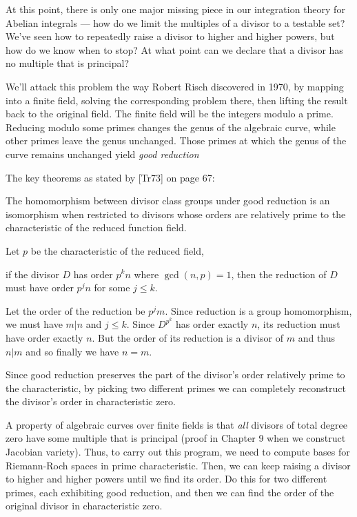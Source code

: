 At this point, there is only one major missing piece in our
integration theory for Abelian integrals --- how do we limit the
multiples of a divisor to a testable set?  We've seen how to
repeatedly raise a divisor to higher and higher powers, but how do we
know when to stop?  At what point can we declare that a divisor has no
multiple that is principal?

We'll attack this problem the way Robert Risch discovered in 1970, by
mapping into a finite field, solving the corresponding problem there,
then lifting the result back to the original field.  The finite field
will be the integers modulo a prime.  Reducing modulo some primes
changes the genus of the algebraic curve, while other primes leave the
genus unchanged.  Those primes at which the genus of the curve remains
unchanged yield {\it good reduction}

The key theorems as stated by [Tr73] on page 67:

\theorem
The homomorphism between divisor class groups under good reduction
is an isomorphism when restricted to divisors whose orders are
relatively prime to the characteristic of the reduced function field.
\endtheorem

Let $p$ be the characteristic of the reduced field,

\theorem
if the divisor $D$ has order $p^k n$ where $\gcd(n,p)=1$, then
the reduction of $D$ must have order $p^j n$ for some $j\le k$.

\proof
Let the order of the reduction be $p^j m$.  Since reduction
is a group homomorphism, we must have $m|n$ and $j \le k$.
Since $D^{p^k}$ has order exactly $n$, its reduction
must have order exactly $n$.  But the order of its
reduction is a divisor of $m$ and thus $n|m$ and so
finally we have $n=m$.

\endtheorem


Since good reduction preserves the part of the divisor's order
relatively prime to the characteristic, by picking two different
primes we can completely reconstruct the divisor's order in
characteristic zero.

A property of algebraic curves over finite fields is that {\it all}
divisors of total degree zero have some multiple that is principal
(proof in Chapter 9 when we construct Jacobian variety).  Thus, to
carry out this program, we need to compute bases for Riemann-Roch
spaces in prime characteristic.  Then, we can keep raising a divisor
to higher and higher powers until we find its order.  Do this for two
different primes, each exhibiting good reduction, and then we can find
the order of the original divisor in characteristic zero.

